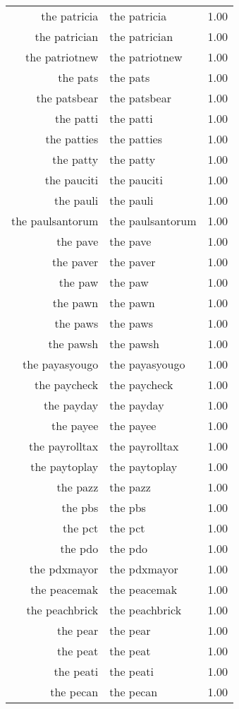 \begin{table}[ht]
\begin{tabular}{rlr}
  the patricia & the patricia & 1.00 \\ 
  the patrician & the patrician & 1.00 \\ 
  the patriotnew & the patriotnew & 1.00 \\ 
  the pats & the pats & 1.00 \\ 
  the patsbear & the patsbear & 1.00 \\ 
  the patti & the patti & 1.00 \\ 
  the patties & the patties & 1.00 \\ 
  the patty & the patty & 1.00 \\ 
  the pauciti & the pauciti & 1.00 \\ 
  the pauli & the pauli & 1.00 \\ 
  the paulsantorum & the paulsantorum & 1.00 \\ 
  the pave & the pave & 1.00 \\ 
  the paver & the paver & 1.00 \\ 
  the paw & the paw & 1.00 \\ 
  the pawn & the pawn & 1.00 \\ 
  the paws & the paws & 1.00 \\ 
  the pawsh & the pawsh & 1.00 \\ 
  the payasyougo & the payasyougo & 1.00 \\ 
  the paycheck & the paycheck & 1.00 \\ 
  the payday & the payday & 1.00 \\ 
  the payee & the payee & 1.00 \\ 
  the payrolltax & the payrolltax & 1.00 \\ 
  the paytoplay & the paytoplay & 1.00 \\ 
  the pazz & the pazz & 1.00 \\ 
  the pbs & the pbs & 1.00 \\ 
  the pct & the pct & 1.00 \\ 
  the pdo & the pdo & 1.00 \\ 
  the pdxmayor & the pdxmayor & 1.00 \\ 
  the peacemak & the peacemak & 1.00 \\ 
  the peachbrick & the peachbrick & 1.00 \\ 
  the pear & the pear & 1.00 \\ 
  the peat & the peat & 1.00 \\ 
  the peati & the peati & 1.00 \\ 
  the pecan & the pecan & 1.00 \\ 

\end{tabular}
\end{table}
